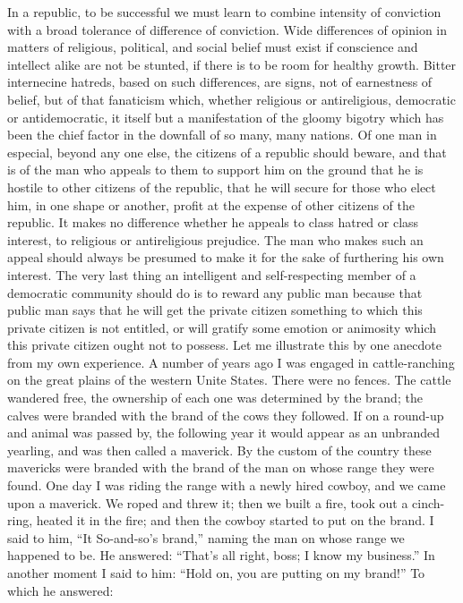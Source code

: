 \documentclass{scrbook}
\begin{document}
In a republic, to be successful we must learn to combine intensity of conviction with
a broad tolerance of difference of conviction. Wide differences of opinion in matters of
religious, political, and social belief must exist if conscience and intellect alike are not be
stunted, if there is to be room for healthy growth. Bitter internecine hatreds, based on such
differences, are signs, not of earnestness of belief, but of that fanaticism which, whether
religious or antireligious, democratic or antidemocratic, it itself but a manifestation of the
gloomy bigotry which has been the chief factor in the downfall of so many, many nations.
Of one man in especial, beyond any one else, the citizens of a republic should beware,
and that is of the man who appeals to them to support him on the ground that he is hostile
to other citizens of the republic, that he will secure for those who elect him, in one shape
or another, profit at the expense of other citizens of the republic. It makes no difference
whether he appeals to class hatred or class interest, to religious or antireligious prejudice.
The man who makes such an appeal should always be presumed to make it for the sake of
furthering his own interest. The very last thing an intelligent and self-respecting member
of a democratic community should do is to reward any public man because that public man
says that he will get the private citizen something to which this private citizen is not entitled,
or will gratify some emotion or animosity which this private citizen ought not to possess.
Let me illustrate this by one anecdote from my own experience. A number of years ago I
was engaged in cattle-ranching on the great plains of the western Unite States. There were
no fences. The cattle wandered free, the ownership of each one was determined by the
brand; the calves were branded with the brand of the cows they followed. If on a round-up
and animal was passed by, the following year it would appear as an unbranded yearling, and
was then called a maverick. By the custom of the country these mavericks were branded
with the brand of the man on whose range they were found. One day I was riding the range
with a newly hired cowboy, and we came upon a maverick. We roped and threw it; then
we built a fire, took out a cinch-ring, heated it in the fire; and then the cowboy started to
put on the brand. I said to him, “It So-and-so’s brand,” naming the man on whose range
we happened to be. He answered: “That’s all right, boss; I know my business.” In another
moment I said to him: “Hold on, you are putting on my brand!” To which he answered:
\end{document}
